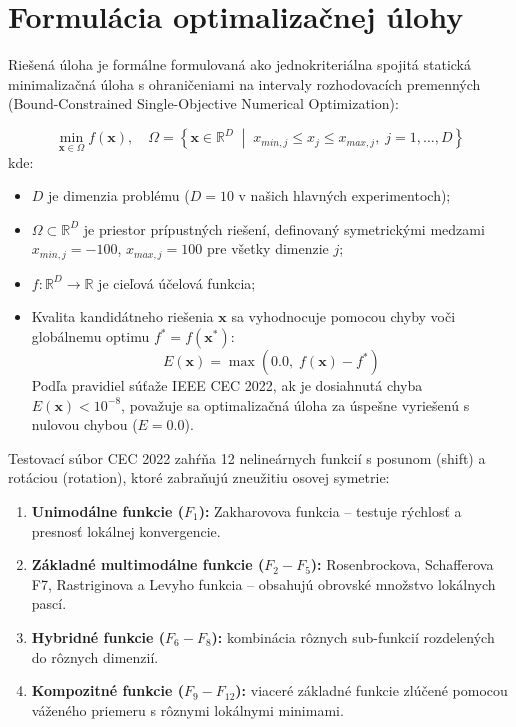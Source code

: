 \documentclass[11pt,a4paper]{article}
\begin{document}
\section{Formulácia optimalizačnej úlohy}
Riešená úloha je formálne formulovaná ako jednokriteriálna spojitá statická minimalizačná úloha s ohraničeniami na intervaly rozhodovacích premenných (Bound-Constrained Single-Objective Numerical Optimization):

\begin{equation}
\min_{\mathbf{x} \in \Omega} f(\mathbf{x}), \quad \Omega = \left\{ \mathbf{x} \in \mathbb{R}^D \;\middle|\; x_{min, j} \le x_j \le x_{max, j}, \; j = 1, \dots, D \right\}
\end{equation}
kde:
\begin{itemize}
    \item $D$ je dimenzia problému ($D = 10$ v našich hlavných experimentoch);
    \item $\Omega \subset \mathbb{R}^D$ je priestor prípustných riešení, definovaný symetrickými medzami $x_{min, j} = -100$, $x_{max, j} = 100$ pre všetky dimenzie $j$;
    \item $f: \mathbb{R}^D \to \mathbb{R}$ je cieľová účelová funkcia;
    \item Kvalita kandidátneho riešenia $\mathbf{x}$ sa vyhodnocuje pomocou chyby voči globálnemu optimu $f^* = f(\mathbf{x}^*)$:
    \begin{equation}
    E(\mathbf{x}) = \max\left(0.0, \; f(\mathbf{x}) - f^*\right)
    \end{equation}
    Podľa pravidiel súťaže IEEE CEC 2022, ak je dosiahnutá chyba $E(\mathbf{x}) < 10^{-8}$, považuje sa optimalizačná úloha za úspešne vyriešenú s nulovou chybou ($E = 0.0$).
\end{itemize}

Testovací súbor CEC 2022 zahŕňa 12 nelineárnych funkcií s posunom (shift) a rotáciou (rotation), ktoré zabraňujú zneužitiu osovej symetrie:
\begin{enumerate}
    \item \textbf{Unimodálne funkcie ($F_1$):} Zakharovova funkcia -- testuje rýchlosť a presnosť lokálnej konvergencie.
    \item \textbf{Základné multimodálne funkcie ($F_2 - F_5$):} Rosenbrockova, Schafferova F7, Rastriginova a Levyho funkcia -- obsahujú obrovské množstvo lokálnych pascí.
    \item \textbf{Hybridné funkcie ($F_6 - F_8$):} kombinácia rôznych sub-funkcií rozdelených do rôznych dimenzií.
    \item \textbf{Kompozitné funkcie ($F_9 - F_{12}$):} viaceré základné funkcie zlúčené pomocou váženého priemeru s rôznymi lokálnymi minimami.
\end{enumerate}
\end{document}
